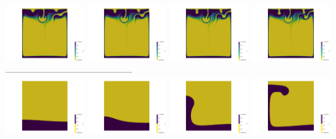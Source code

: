 \begin{itemize}
\begin{center}
\includegraphics[width=3cm]{images/benchmark_vaks97/aspect/lvl8/composition0016}
\includegraphics[width=3cm]{images/benchmark_vaks97/aspect/lvl8/composition0017}
\includegraphics[width=3cm]{images/benchmark_vaks97/aspect/lvl8/composition0018}
\includegraphics[width=3cm]{images/benchmark_vaks97/aspect/lvl8/composition0019}\\
---------------------------------------\\
\includegraphics[width=3cm]{images/benchmark_vaks97/aspect/lvl8/composition_threshold0000}
\includegraphics[width=3cm]{images/benchmark_vaks97/aspect/lvl8/composition_threshold0001}
\includegraphics[width=3cm]{images/benchmark_vaks97/aspect/lvl8/composition_threshold0002}
\includegraphics[width=3cm]{images/benchmark_vaks97/aspect/lvl8/composition_threshold0003}

\end{center}
\end{itemize}
